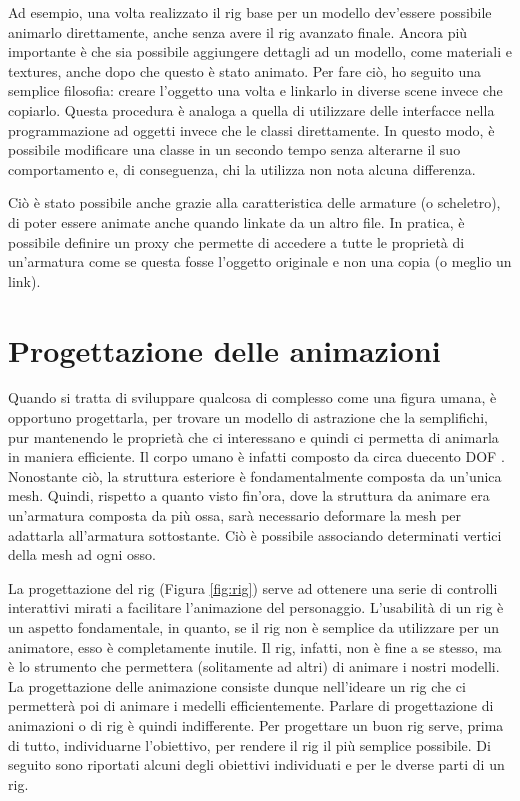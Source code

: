 Ad esempio, una volta realizzato il rig base per un modello dev'essere possibile animarlo direttamente, anche senza avere il rig avanzato finale. Ancora più importante è che sia possibile aggiungere dettagli ad un modello, come materiali e textures, anche dopo che questo è stato animato.
Per fare ciò, ho seguito una semplice filosofia: creare l'oggetto una volta e linkarlo in diverse scene invece che copiarlo.
Questa procedura è analoga a quella di utilizzare delle interfacce nella programmazione ad oggetti invece che le classi direttamente. In questo modo, è possibile modificare una classe in un secondo tempo senza alterarne il suo comportamento e, di conseguenza, chi la utilizza non nota alcuna differenza.

Ciò è stato possibile anche grazie alla caratteristica delle armature (o scheletro), di poter essere animate anche quando linkate da un altro file.
In pratica, è possibile definire un proxy che permette di accedere a tutte le proprietà di un'armatura come se questa fosse l'oggetto originale e non una copia (o meglio un link).

\section{Progettazione delle animazioni}

Quando si tratta di sviluppare qualcosa di complesso come una figura umana, è opportuno progettarla, per trovare un modello di astrazione che la semplifichi, pur mantenendo le proprietà che ci interessano e quindi ci permetta di animarla in maniera efficiente.
Il corpo umano è infatti composto da circa duecento DOF \cite{Parent:2012:CAA:2385444}.
Nonostante ciò, la struttura esteriore è fondamentalmente composta da un'unica mesh.
Quindi, rispetto a quanto visto fin'ora, dove la struttura da animare era un'armatura composta da più ossa, sarà necessario deformare la mesh per adattarla all'armatura sottostante. Ciò è possibile associando determinati vertici della mesh ad ogni osso.

La progettazione del rig (Figura \ref{fig:rig}) serve ad ottenere una serie di controlli interattivi mirati a facilitare l'animazione del personaggio.
L'usabilità di un rig è un aspetto fondamentale, in quanto, se il rig non è semplice da utilizzare per un animatore, esso è completamente inutile.
Il rig, infatti, non è fine a se stesso, ma è lo strumento che permettera (solitamente ad altri) di animare i nostri modelli.
La progettazione delle animazione consiste dunque nell'ideare un rig che ci permetterà poi di animare i medelli efficientemente. Parlare di progettazione di animazioni o di rig è quindi indifferente.
Per progettare un buon rig serve, prima di tutto, individuarne l'obiettivo, per rendere il rig il più semplice possibile.
Di seguito sono riportati alcuni degli obiettivi individuati e per le dverse parti di un rig.

